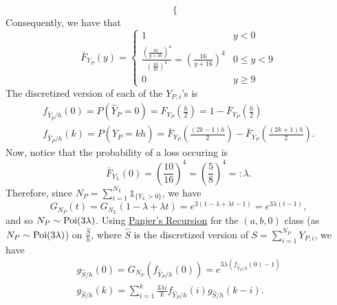 \documentclass[notoc,notitlepage]{tufte-book}
\begin{document}
\begin{solution}
\begin{equation*}
\begin{cases}
    \end{cases}
  \end{equation*}
  Consequently, we have that
  \begin{equation*}
    \bar{F}_{Y_P}(y) = \begin{cases}
      1 & y < 0 \\
      \frac{\left( \frac{10}{y + 16} \right)^4}{\left( \frac{10}{16} \right)^4} = \left( \frac{16}{y + 16} \right)^4 & 0 \leq y < 9 \\
      0 & y \geq 9
    \end{cases}
  \end{equation*}
  The discretized version of each of the $Y_{P, i}$'s is
  \begin{gather*}
    f_{\bar{Y}_p / h} (0) = P \left( \hat{Y}_P = 0 \right) = F_{Y_P} \left( \frac{h}{2} \right) = 1 - \bar{F}_{Y_P} \left( \frac{h}{2} \right) \\
    f_{\hat{Y}_P / h} (k) = P \left( \hat{Y}_P = kh \right) = \bar{F}_{Y_P} \left( \frac{( 2k - 1 ) h}{2} \right) - \bar{F}_{Y_P} \left( \frac{( 2k + 1 ) h}{2} \right).
  \end{gather*}
  Now, notice that the probability of a loss occuring is
  \begin{equation*}
    \bar{F}_{Y_L} (0) = \left( \frac{10}{16} \right)^4 = \left( \frac{5}{8} \right)^4 =: \lambda.
  \end{equation*}
  Therefore, since $N_P = \sum_{i=1}^{N_L} \mathbb{1}_{\{Y_L > 0\}}$, we have
  \begin{equation*}
    G_{N_P} (t) = G_{N_L} ( 1 - \lambda + \lambda t ) = e^{3 ( 1 - \lambda + \lambda t - 1 )} = e^{3 \lambda ( t - 1 )},
  \end{equation*}
  and so $N_P \sim \operatorname{Poi}(3 \lambda)$. Using \hyperref[thm:panjer_s_recursion_for_a_b_0_class]{Panjer's Recursion} for the $(a, b, 0)$ class (as $N_P \sim \operatorname{Poi}(3 \lambda)$) on $\frac{\hat{S}}{h}$, where $\hat{S}$ is the discretized version of $S = \sum_{i=1}^{N_P} Y_{P, i}$, we have
  \begin{gather*}
    g_{\hat{S} / h} (0) = G_{N_P} \left( f_{\hat{Y}_P / h} (0) \right) = e^{3 \lambda \left( f_{\hat{Y}_P / h} (0) - 1 \right)} \\
    g_{\hat{S} / h} (k) = \sum_{i=1}^{k} \frac{3 \lambda i}{k}f_{\hat{Y}_P / h} (i) g_{\hat{S} / h} (k - i).
  \end{gather*}
\end{solution}

\end{document}
